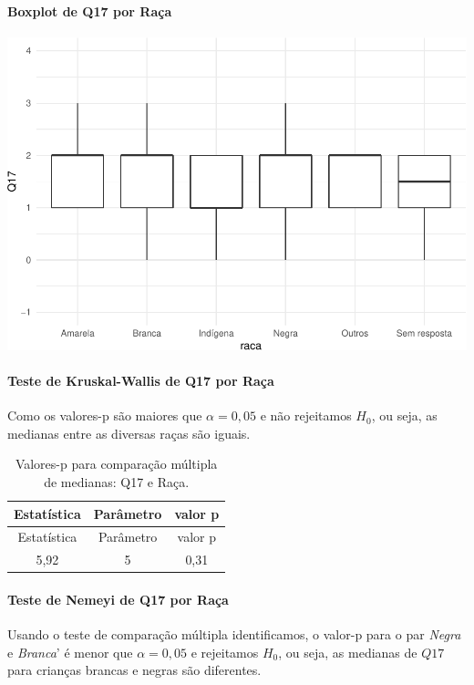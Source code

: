 \documentclass[]{article}
\let\oldparagraph\paragraph
\renewcommand{\paragraph}[1]{\oldparagraph{#1}\mbox{}}
\begin{document}
\hypertarget{boxplot-de-q17-por-rauxe7a}{%
\paragraph{Boxplot de Q17 por Raça}\label{boxplot-de-q17-por-rauxe7a}}

\begin{center}\includegraphics[width=0.75\linewidth]{relatorio_files/figure-latex/unnamed-chunk-206-1} \end{center}

\hypertarget{teste-de-kruskal-wallis-de-q17-por-rauxe7a}{%
\paragraph{Teste de Kruskal-Wallis de Q17 por Raça}\label{teste-de-kruskal-wallis-de-q17-por-rauxe7a}}

Como os valores-p são maiores que \(\alpha=0,05\) e não rejeitamos \(H_0\), ou seja, as medianas entre as diversas raças são iguais.

\begin{longtable}[]{@{}ccc@{}}
\caption{\label{tab:unnamed-chunk-207}Valores-p para comparação múltipla de medianas: Q17 e Raça.}\tabularnewline
\toprule
Estatística & Parâmetro & valor p\tabularnewline
\midrule
\endfirsthead
\toprule
Estatística & Parâmetro & valor p\tabularnewline
\midrule
\endhead
5,92 & 5 & 0,31\tabularnewline
\bottomrule
\end{longtable}

\hypertarget{teste-de-nemeyi-de-q17-por-rauxe7a}{%
\paragraph{Teste de Nemeyi de Q17 por Raça}\label{teste-de-nemeyi-de-q17-por-rauxe7a}}

Usando o teste de comparação múltipla identificamos, o valor-p para o par \emph{Negra} e \emph{Branca}' é menor que \(\alpha=0,05\) e rejeitamos \(H_0\), ou seja, as medianas de \(Q17\) para crianças brancas e negras são diferentes.
\end{document}
